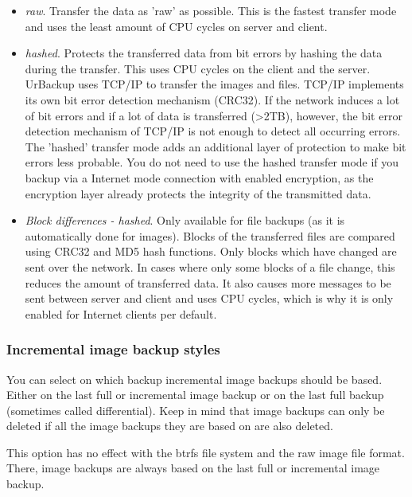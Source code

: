 \documentclass[a4paper,10pt]{article}
\begin{document}
\begin{itemize}
  \item \textsl{raw}. Transfer the data as 'raw' as possible. This is the fastest transfer
  		mode and uses the least amount of CPU cycles on server and client.
  \item \textsl{hashed}. Protects the transferred data from bit errors by hashing the data
  		during the transfer. This uses CPU cycles on the client and the server.\\
  		UrBackup uses TCP/IP to transfer the images and files. TCP/IP implements its own
  		bit error detection mechanism (CRC32). If the network induces a lot of bit errors
  		and if a lot of data is transferred (>2TB), however, the bit error detection mechanism
  		of TCP/IP is not enough to detect all occurring errors. The 'hashed' transfer mode
  		adds an additional layer of protection to make bit errors less probable.
  		You do not need to use the hashed transfer mode if you backup via a Internet mode
  		connection with enabled encryption, as the encryption layer already protects the integrity
  		of the transmitted data.
  \item \textsl{Block differences - hashed}. Only available for file backups (as it is
  		automatically done for images). Blocks of the transferred files are compared using
  		CRC32 and MD5 hash functions. Only blocks which have changed are sent over the
  		network. In cases where only some blocks of a file change, this reduces the amount
  		of transferred data. It also causes more messages to be sent between server and
  		client and uses CPU cycles, which is why it is only enabled for Internet clients
  		per default. 
\end{itemize}

\subsubsection{Incremental image backup styles}

You can select on which backup incremental image backups should be based. Either on the last full or incremental image backup or on the last full backup (sometimes called differential).
Keep in mind that image backups can only be deleted if all the image backups they are based on are also deleted.

\par\null\par
This option has no effect with the btrfs file system and the raw image file format. There, image backups are always based on the last full or incremental image backup.
\end{document}
